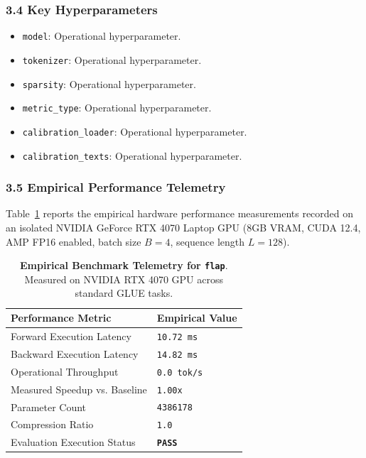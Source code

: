\subsubsection*{3.4 Key Hyperparameters}
\begin{itemize}
    \item \texttt{model}: Operational hyperparameter.
    \item \texttt{tokenizer}: Operational hyperparameter.
    \item \texttt{sparsity}: Operational hyperparameter.
    \item \texttt{metric\_type}: Operational hyperparameter.
    \item \texttt{calibration\_loader}: Operational hyperparameter.
    \item \texttt{calibration\_texts}: Operational hyperparameter.
\end{itemize}

\subsubsection*{3.5 Empirical Performance Telemetry}
Table~\ref{tab:telemetry_flap} reports the empirical hardware performance measurements recorded on an isolated NVIDIA GeForce RTX 4070 Laptop GPU (8GB VRAM, CUDA 12.4, AMP FP16 enabled, batch size $B=4$, sequence length $L=128$).

\begin{table}[h]
\centering
\small
\caption{\textbf{Empirical Benchmark Telemetry for \texttt{flap}}. Measured on NVIDIA RTX 4070 GPU across standard GLUE tasks.}
\label{tab:telemetry_flap}
\begin{tabularx}{\columnwidth}{lX}
\toprule
\textbf{Performance Metric} & \textbf{Empirical Value} \\
\midrule
Forward Execution Latency & \texttt{10.72 ms} \\
Backward Execution Latency & \texttt{14.82 ms} \\
Operational Throughput & \texttt{0.0 tok/s} \\
Measured Speedup vs. Baseline & \texttt{1.00x} \\
Parameter Count & \texttt{4386178} \\
Compression Ratio & \texttt{1.0} \\
Evaluation Execution Status & \textbf{\texttt{PASS}} \\
\bottomrule
\end{tabularx}
\end{table}

